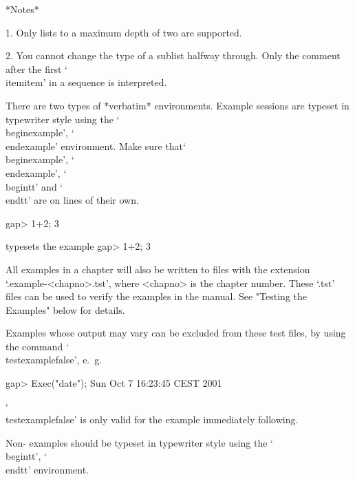 *Notes*

\beginlist%
\item{1.} Only lists to a maximum depth of two are supported.

\item{2.} You cannot change the type of a sublist halfway through. Only
the comment after the first `\\itemitem' in a sequence is interpreted.

\endlist

\indextt{\\begintt}\indextt{\\endtt}
\indextt{\\beginexample}\indextt{\\endexample}
There are two types of *verbatim* environments.
Example {\GAP} sessions are typeset in typewriter style
using the `\\beginexample', `\\endexample' environment.
Make sure that`\\beginexample', `\\endexample',  `\\begintt'
and `\\endtt' are on lines of their own.

\begintt
\beginexample
gap> 1+2;
3
\endexample
\endtt

typesets the example
\beginexample
gap> 1+2;
3
\endexample

All examples in a chapter will also be written to files with the extension
`.example-<chapno>.tst', where <chapno> is the chapter number. These `.tst'
files can be used to verify the examples in the manual. See
"Testing the Examples" below for details.

Examples whose output may vary can be excluded from these test files, by
using the command `\\testexamplefalse', e.~g.

\begintt
\testexamplefalse
\beginexample
gap> Exec("date");
Sun Oct  7 16:23:45 CEST 2001
\endexample
\endtt

`\\testexamplefalse' is only valid for the example immediately following.

Non-{\GAP} examples should be typeset in typewriter style
using the `\\begintt', `\\endtt' environment.

